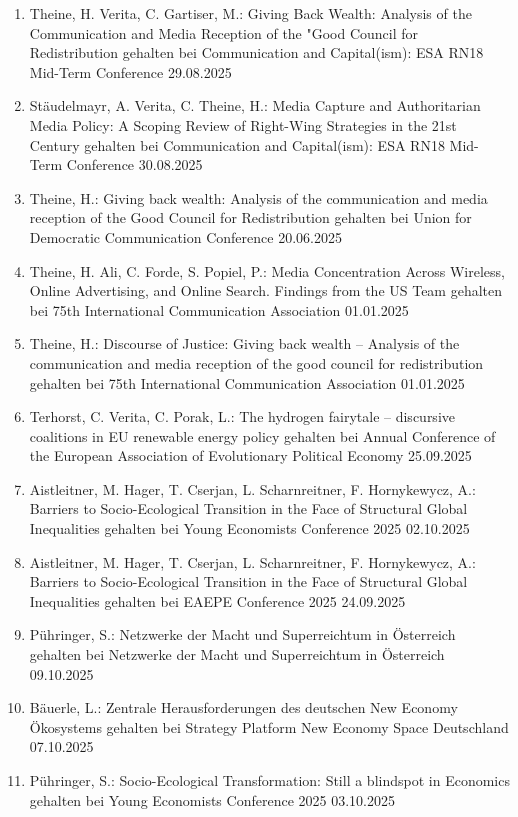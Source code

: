 \begin{enumerate}
	\item Theine, H. Verita, C. Gartiser, M.: Giving Back Wealth: Analysis of the Communication and Media Reception of the "Good Council for Redistribution gehalten bei Communication and Capital(ism): ESA RN18 Mid-Term Conference 29.08.2025
	\item Stäudelmayr, A. Verita, C. Theine, H.: Media Capture and Authoritarian Media Policy: A Scoping Review of Right-Wing Strategies in the 21st Century gehalten bei Communication and Capital(ism): ESA RN18 Mid-Term Conference 30.08.2025
	\item Theine, H.: Giving back wealth: Analysis of the communication and media reception of the \glqq Good Council for Redistribution\grqq{} gehalten bei Union for Democratic Communication Conference 20.06.2025
	\item Theine, H. Ali, C. Forde, S. Popiel, P.: Media Concentration Across Wireless, Online Advertising, and Online Search​. Findings from the US Team gehalten bei 75th International Communication Association 01.01.2025
	\item Theine, H.: Discourse of Justice: Giving back wealth -- Analysis of the communication and media reception of the good council for redistribution gehalten bei 75th International Communication Association 01.01.2025
	\item Terhorst, C. Verita, C. Porak, L.: The hydrogen fairytale -- discursive coalitions in EU renewable energy policy gehalten bei Annual Conference of the European Association of Evolutionary Political Economy 25.09.2025
	\item Aistleitner, M. Hager, T. Cserjan, L. Scharnreitner, F. Hornykewycz, A.: Barriers to Socio-Ecological Transition in the Face of Structural Global Inequalities gehalten bei Young Economists Conference 2025 02.10.2025
	\item Aistleitner, M. Hager, T. Cserjan, L. Scharnreitner, F. Hornykewycz, A.: Barriers to Socio-Ecological Transition in the Face of Structural Global Inequalities gehalten bei EAEPE Conference 2025 24.09.2025
	\item Pühringer, S.: Netzwerke der Macht und Superreichtum in Österreich gehalten bei Netzwerke der Macht und Superreichtum in Österreich 09.10.2025
	\item Bäuerle, L.: Zentrale Herausforderungen des deutschen New Economy Ökosystems gehalten bei Strategy Platform New Economy Space Deutschland 07.10.2025
	\item Pühringer, S.: Socio-Ecological Transformation: Still a blindspot in Economics gehalten bei Young Economists Conference 2025 03.10.2025

\end{enumerate}

